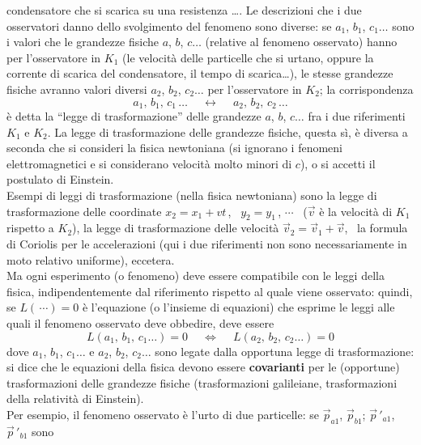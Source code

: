 condensatore che si scarica su una resistenza \dots. Le descrizioni che i due
osservatori danno dello svolgimento del fenomeno sono diverse: se $a_1$, $b_1$,
$c_1\dots$ sono i valori che le grandezze fisiche $a$, $b$, $c\dots$ (relative
al fenomeno osservato) hanno per l'osservatore in $K_1$ (le velocit\`a delle
particelle che si urtano, oppure la corrente di scarica del condensatore, il
tempo di scarica\dots), le stesse grandezze fisiche avranno valori diversi
$a_2$, $b_2$, $c_2\dots$ per l'osservatore in $K_2$; la corrispondenza
\begin{equation}
  a_1,\,b_1,\,c_1\,\dots\quad\ \leftrightarrow\quad\ a_2,\,b_2,\,c_2\,\dots
  \tag{4.5}
\end{equation}
\`e detta la ``legge di trasformazione'' delle grandezze $a$, $b$, $c\dots$ fra
i due riferimenti $K_1$ e $K_2$. La legge di trasformazione delle grandezze
fisiche, questa s\`i, \`e diversa a seconda che si consideri la fisica
newtoniana (si ignorano i fenomeni elettromagnetici e si considerano velocit\`a
molto minori di $c$), o si accetti il postulato di Einstein.\\
Esempi di leggi di trasformazione (nella fisica newtoniana) sono la legge di
trasformazione delle coordinate $x_2=x_1+vt$\,, \ $y_2=y_1$\,, $\cdots$
\ ($\vec v$ \`e la velocit\`a di $K_1$ rispetto a $K_2$), la legge di
trasformazione delle velocit\`a $\vec v_2=\vec v_1+\vec v$, \ la formula di
Coriolis per le accelerazioni (qui i due riferimenti non sono necessariamente in
moto relativo uniforme), eccetera.\\
Ma ogni esperimento (o fenomeno) deve essere compatibile con le leggi della
fisica, indipendentemente dal riferimento rispetto al quale viene osservato:
quindi, se $L(\,\cdots)=0$ \`e l'equazione (o l'insieme di equazioni) che
esprime le leggi alle quali il fenomeno osservato deve obbedire, deve essere
\begin{equation}
  L(a_1,\,b_1,\,c_1\dots)=0
  \quad\ \Longleftrightarrow\quad\ L(a_2,\,b_2,\,c_2\dots)=0
  \tag{4.6}
\end{equation}
dove $a_1$, $b_1$, $c_1\dots$ e $a_2$, $b_2$, $c_2\dots$ sono legate dalla
opportuna legge di trasformazione: si dice che le equazioni della fisica devono
essere \textbf{covarianti} per le (opportune) trasformazioni delle grandezze
fisiche (trasformazioni galileiane, trasformazioni della relativit\`a di
Einstein).\\
Per esempio, il fenomeno osservato \`e l'urto di due particelle: se
$\vec p_{a1}$, $\vec p_{b1}$; $\vec p\,'_{a1}$, $\vec p\,'_{b1}$ sono
